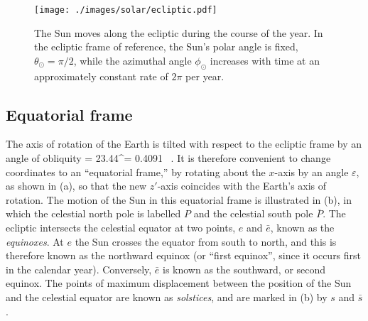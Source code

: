 \begin{figure} [tbh]
\begin{center}
	\texttt{[image: ./images/solar/ecliptic.pdf]}
\end{center}
\caption{\small The Sun moves along the ecliptic during the course of the year.  In the ecliptic frame of reference, the Sun's polar angle is fixed, $\theta_\odot = \pi / 2$, while the azimuthal angle $\phi_\odot$ increases with time at an approximately constant rate of $2 \pi$ per year.}
\end{figure}

\subsection{Equatorial frame}

The axis of rotation of the Earth is tilted with respect to the ecliptic frame by an angle of obliquity
\be
\varepsilon = 23.44^\circ = 0.4091 ~.
\ee
It is therefore convenient to change coordinates to an ``equatorial frame,'' by rotating about the $x$-axis by an angle $\varepsilon$, as shown in (a), so that the new $z'$-axis coincides with the Earth's axis of rotation.  The motion of the Sun in this equatorial frame is illustrated in (b), in which the celestial north pole is labelled $P$ and the celestial south pole $\overline P$.  The ecliptic intersects the celestial equator at two points, $e$ and $\bar e$, known as the {\it equinoxes}.  At $e$ the Sun crosses the equator from south to north, and this is therefore known as the northward equinox (or ``first equinox'', since it occurs first in the calendar year).  Conversely, $\bar e$ is known as the southward, or second equinox.  The points of maximum displacement between the position of the Sun and the celestial equator are known as {\it solstices}, and are marked in (b) by $s$ and $\bar s$.

